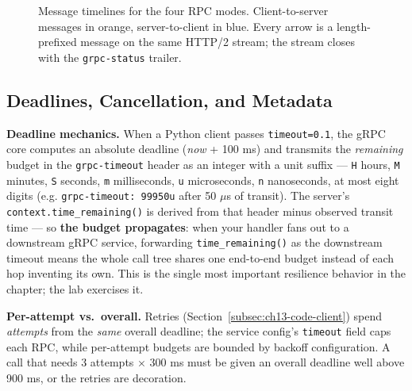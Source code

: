 \begin{figure}[htbp]
\caption{Message timelines for the four RPC modes. Client-to-server messages in
orange, server-to-client in blue. Every arrow is a length-prefixed message on
the same HTTP/2 stream; the stream closes with the \texttt{grpc-status}
trailer.}
\label{fig:ch13-four-modes}
\end{figure}

\subsection{Deadlines, Cancellation, and Metadata}
\label{subsec:ch13-deadlines}

\textbf{Deadline mechanics.} When a Python client passes
\texttt{timeout=0.1}, the gRPC core computes an absolute deadline
(\emph{now} + 100 ms) and transmits the \emph{remaining} budget in the
\texttt{grpc-timeout} header as an integer with a unit suffix ---
\texttt{H} hours, \texttt{M} minutes, \texttt{S} seconds, \texttt{m}
milliseconds, \texttt{u} microseconds, \texttt{n} nanoseconds, at most eight
digits (e.g. \texttt{grpc-timeout: 99950u} after 50 $\mu$s of transit). The
server's \texttt{context.time\_remaining()} is derived from that header minus
observed transit time --- so \textbf{the budget propagates}: when your handler
fans out to a downstream gRPC service, forwarding \texttt{time\_remaining()} as
the downstream timeout means the whole call tree shares one end-to-end budget
instead of each hop inventing its own. This is the single most important
resilience behavior in the chapter; the lab exercises it.

\textbf{Per-attempt vs.\ overall.} Retries (Section~\ref{subsec:ch13-code-client})
spend \emph{attempts} from the \emph{same} overall deadline; the service config's
\texttt{timeout} field caps each RPC, while per-attempt budgets are bounded by
backoff configuration. A call that needs 3 attempts $\times$ 300 ms must be
given an overall deadline well above 900 ms, or the retries are decoration.

